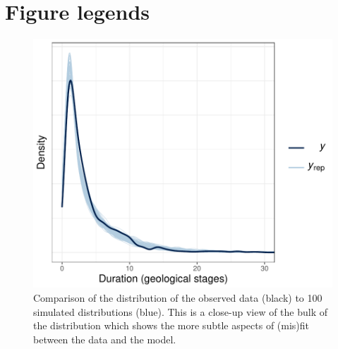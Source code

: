 \documentclass[11pt]{article}
\begin{document}
\newpage{}


\section*{Figure legends}

\begin{figure}[ht]
  \centering
  \includegraphics[height = 0.5\textheight,width=\textwidth,keepaspectratio=true]{figure/ppc_dens_zoom_cweib_cens}
  \caption{ Comparison of the distribution of the observed data (black) to 100 simulated distributions (blue). This is a close-up view of the bulk of the distribution which shows the more subtle aspects of (mis)fit between the data and the model. }
  \label{fig:dens_overlay_zoom}
\end{figure}
\end{document}
